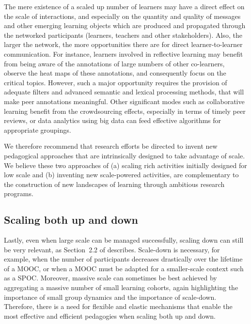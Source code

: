 The mere existence of a scaled up number of learners may have a direct
effect on the scale of interactions, and especially on the quantity and
quality of messages and other emerging learning objects which are
produced and propagated through the networked participants (learners,
teachers and other stakeholders). Also, the larger the network, the more
opportunities there are for direct learner-to-learner communication. For
instance, learners involved in reflective learning may benefit from
being aware of the annotations of large numbers of other co-learners,
observe the heat maps of these annotations, and consequently focus on
the critical topics. However, such a major opportunity requires the
provision of adequate filters and advanced semantic and lexical
processing methods, that will make peer annotations meaningful. Other
significant modes such as collaborative learning benefit from the
crowdsourcing effects, especially in terms of timely peer reviews, or
data analytics using big data can feed effective algorithms for
appropriate groupings.

We therefore recommend that research efforts be directed to invent new
pedagogical approaches that are intrinsically designed to take advantage
of scale. We believe these two approaches of (a) scaling rich activities
initially designed for low scale and (b) inventing new scale-powered
activities, are complementary to the construction of new landscapes of
learning through ambitious research programs.

\subsection{Scaling both up and down}

Lastly, even when large scale can be managed successfully, 
scaling down can still be very relevant, as 
Section~2.2 of \cite{mroe-2013-report} describes.
Scale-down is necessary, for example, when the number of
participants decreases drastically over the lifetime of a
MOOC, or when a MOOC must be adapted for a smaller-scale context such as
a SPOC.  
Moreover, massive scale can sometimes be best
achieved by aggregating a massive number of small learning cohorts,
again highlighting the importance of small group dynamics and the
importance of scale-down.
Therefore, there is a need for flexible and
elastic mechanisms that enable the most effective and efficient
pedagogies when scaling both up and down.  

